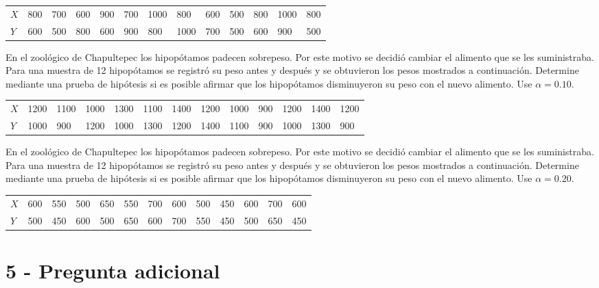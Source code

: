 \documentclass[addpoints]{exam}
\theoremstyle{mytheor}
\begin{document}
\begin{questions}
  
  \begin{table}[h]
  \centering
  \begin{tabular}{lllllllllllll} 
  $X$ & 800 & 700 & 600 & 900 & 700 & 1000 & 800 & 600 & 500 & 800 & 1000 & 800 \\
  $Y$ & 600 & 500 & 800 & 600 & 900 & 800 & 1000 & 700 & 500 & 600 & 900 & 500
  \end{tabular}
  \end{table}
  
  
  \question En el zoológico de Chapultepec los hipopótamos padecen sobrepeso. Por este motivo se decidió cambiar el alimento que se les suministraba. Para una muestra de 12 hipopótamos se registró su peso antes y después y se obtuvieron los pesos mostrados a continuación. Determine mediante una prueba de hipótesis si es posible afirmar que los hipopótamos disminuyeron su peso con el nuevo alimento. Use $\alpha = 0.10$. 
  \begin{table}[h]
  \centering
  \begin{tabular}{lllllllllllll} 
  $X$ & 1200 & 1100 & 1000 & 1300 & 1100 & 1400 & 1200 & 1000 & 900 & 1200 & 1400 & 1200 \\
  $Y$ & 1000 & 900 & 1200 & 1000 & 1300 & 1200 & 1400 & 1100 & 900 & 1000 & 1300 & 900
  \end{tabular}
  \end{table}
  
  \question En el zoológico de Chapultepec los hipopótamos padecen sobrepeso. Por este motivo se decidió cambiar el alimento que se les suministraba. Para una muestra de 12 hipopótamos se registró su peso antes y después y se obtuvieron los pesos mostrados a continuación. Determine mediante una prueba de hipótesis si es posible afirmar que los hipopótamos disminuyeron su peso con el nuevo alimento. Use $\alpha = 0.20$. 
  \begin{table}[h]
  \centering
  \begin{tabular}{lllllllllllll} 
  $X$ & 600 & 550 & 500 & 650 & 550 & 700 & 600 & 500 & 450 & 600 & 700 & 600 \\
  $Y$ & 500 & 450 & 600 & 500 & 650 & 600 & 700 & 550 & 450 & 500 & 650 & 450
  \end{tabular}
  \end{table}
  
  
  \newpage
  \section*{5 - Pregunta adicional}    
  

\end{questions}
\end{document}
